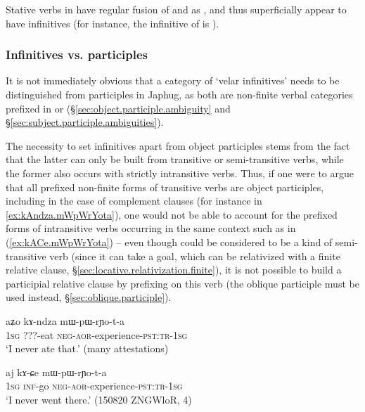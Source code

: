 Stative verbs in  have regular fusion of  and  as , and thus superficially appear to have  infinitives (for instance, the infinitive of  is  ).

\subsubsection{Infinitives vs. participles} \label{sec:infinitives.participles}
It is not immediately obvious that a category of `velar infinitives' needs to be distinguished from participles in Japhug, as both are non-finite verbal categories prefixed in  or  (§\ref{sec:object.participle.ambiguity} and §\ref{sec:subject.participle.ambiguities}). 

The necessity to set  infinitives apart from object participles stems from the fact that the latter can only be built from transitive or semi-transitive verbs, while the former also occurs with strictly intransitive verbs. Thus, if one were to argue that all prefixed non-finite forms of transitive verbs are object participles, including in the case of complement clauses (for instance  in \ref{ex:kAndza.mWpWrYota}), one would not be able to account for the prefixed forms of intransitive verbs occurring in the same context such as  in (\ref{ex:kACe.mWpWrYota}) -- even though  could be considered to be a kind of semi-transitive verb (since it can take a goal, which can be relativized with a finite relative clause, §\ref{sec:locative.relativization.finite}), it is not possible to build a participial relative clause by prefixing  on this verb (the oblique participle  must be used instead, §\ref{sec:oblique.participle}).

\begin{exe}
\ex \label{ex:kAndza.mWpWrYota}
\gll aʑo kɤ-ndza mɯ-pɯ-rɲo-t-a \\
\textsc{1sg} ???-eat \textsc{neg}-\textsc{aor}-experience-\textsc{pst}:\textsc{tr}-\textsc{1sg} \\
\glt `I never ate that.' (many attestations)
\end{exe}

\begin{exe}
\ex \label{ex:kACe.mWpWrYota}
\gll  aj kɤ-ɕe mɯ-pɯ-rɲo-t-a \\
\textsc{1sg} \textsc{inf}-go \textsc{neg}-\textsc{aor}-experience-\textsc{pst}:\textsc{tr}-\textsc{1sg}  \\
\glt `I never went there.' (150820 ZNGWloR, 4)
\end{exe}

